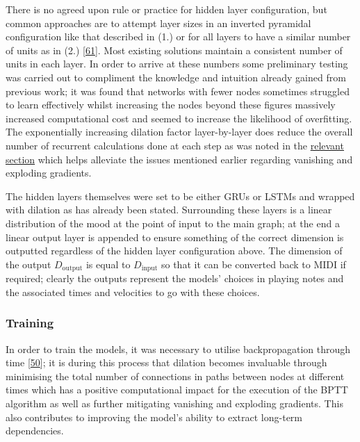 \documentclass[12pt,]{article}
\begin{document}
There is no agreed upon rule or practice for hidden layer configuration,
but common approaches are to attempt layer sizes in an inverted
pyramidal configuration like that described in (1.) or for all layers to
have a similar number of units as in (2.)
{[}\protect\hyperlink{ref-doi10108001431160802549278}{61}{]}. Most
existing solutions maintain a consistent number of units in each layer.
In order to arrive at these numbers some preliminary testing was carried
out to compliment the knowledge and intuition already gained from
previous work; it was found that networks with fewer nodes sometimes
struggled to learn effectively whilst increasing the nodes beyond these
figures massively increased computational cost and seemed to increase
the likelihood of overfitting. The exponentially increasing dilation
factor layer-by-layer does reduce the overall number of recurrent
calculations done at each step as was noted in the
\protect\hyperlink{dilation}{relevant section} which helps alleviate the
issues mentioned earlier regarding vanishing and exploding gradients.

The hidden layers themselves were set to be either GRUs or LSTMs and
wrapped with dilation as has already been stated. Surrounding these
layers is a linear distribution of the mood at the point of input to the
main graph; at the end a linear output layer is appended to ensure
something of the correct dimension is outputted regardless of the hidden
layer configuration above. The dimension of the output
\(D_{\text{output}}\) is equal to \(D_{\text{input}}\) so that it can be
converted back to MIDI if required; clearly the outputs represent the
models' choices in playing notes and the associated times and velocities
to go with these choices.

\hypertarget{training}{%
\subsubsection{Training}\label{training}}

In order to train the models, it was necessary to utilise
backpropagation through time
{[}\protect\hyperlink{ref-werbos1990backpropagation}{50}{]}; it is
during this process that dilation becomes invaluable through minimising
the total number of connections in paths between nodes at different
times which has a positive computational impact for the execution of the
BPTT algorithm as well as further mitigating vanishing and exploding
gradients. This also contributes to improving the model's ability to
extract long-term dependencies.
\end{document}
